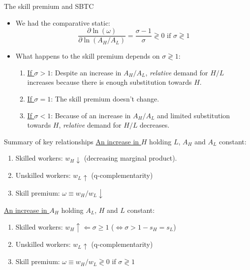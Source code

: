 \documentclass[notes=show]{beamer}
\begin{document}
\begin{frame}{The skill premium and SBTC}
\begin{itemize}
\item We had the comparative static:
\[
\frac{\partial \ln( \omega )}{ \partial \ln(A_{H}/A_{L})} = \frac{ \sigma - 1 }{ \sigma} \gtrless 0 \text{ if } \sigma \gtrless 1
 \tag{8} \label{eq8}
\]
\item What happens to the skill premium depends on $ \sigma \gtrless 1 $: \bigskip
\begin{enumerate}
\item \underline{If $ \sigma > 1 $}: Despite an increase in $A_{H}/A_{L}$, \textit{relative} demand for $H/L$ increases because there is enough substitution towards $H$.\bigskip
\item \underline{If $ \sigma = 1 $}: The skill premium doesn't change. \bigskip
\item \underline{If $ \sigma < 1 $}: Because of an increase in $A_{H}/A_{L}$ and limited substitution towards $H$, \textit{relative} demand for $H/L$ decreases.
\end{enumerate}
\end{itemize}
\end{frame}

\begin{frame}{Summary of key relationships}
\underline{An increase in $H$} holding $L$, $A_{H}$ and $A_{L}$ constant: \medskip
\begin{enumerate}
\item Skilled workers: $w_{H} \downarrow $ (decreasing marginal product). \medskip
\item Unskilled workers: $ w_{L} \uparrow $ (q-complementarity) \medskip
\item Skill premium: $ \omega \equiv w_{H}/w_{L} \downarrow $ \medskip
\end{enumerate}
\underline{An increase in $A_{H}$} holding $A_{L}$, $H$ and $L$ constant: \medskip
\begin{enumerate}
\item Skilled workers: $w_{H} \uparrow \Leftarrow \sigma \geqslant 1 $ ($\Leftrightarrow \sigma > 1 - s_{H} = s_{L} $) \medskip
\item Unskilled workers: $ w_{L} \uparrow $ (q-complementarity)\medskip
\item Skill premium: $ \omega \equiv w_{H}/w_{L} \gtrless 0 $ if $ \sigma \gtrless 1 $ \medskip
\end{enumerate}
\end{frame}
\end{document}
